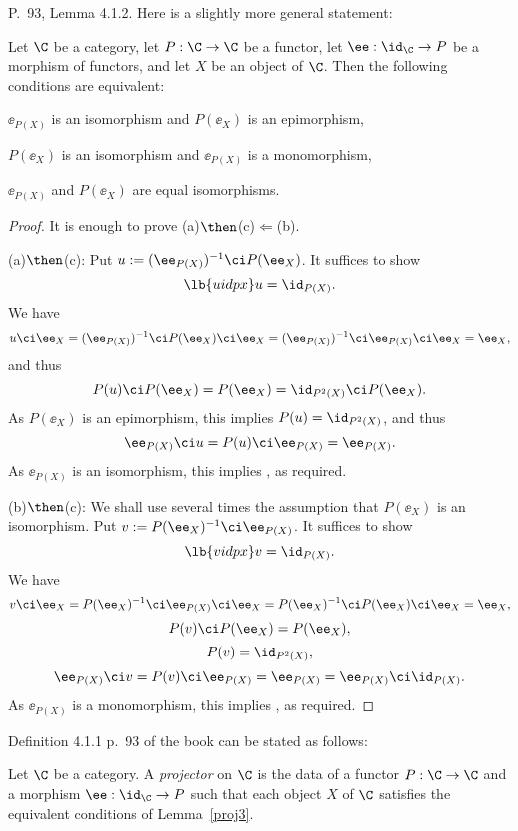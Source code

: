 \documentclass[12pt]{article}
\theoremstyle{remark}
\theoremstyle{definition}
\begin{document}
\begin{s}
P.~93, Lemma 4.1.2. Here is a slightly more general statement:

\begin{lem}
Let $\C$ be a category, let $P:\C\to\C$ be a functor, let $\ee:\id_\C\to P$ be a morphism of functors, and let $X$ be an object of $\C$. Then the following conditions are equivalent:

 $\ee_{P(X)}$ is an isomorphism and $P(\ee_X)$ is an epimorphism,

 $P(\ee_X)$ is an isomorphism and $\ee_{P(X)}$ is a monomorphism,

 $\ee_{P(X)}$ and $P(\ee_X)$ are equal isomorphisms.
\end{lem}

\begin{proof} It is enough to prove (a)$\then$(c)$\Leftarrow$(b). 

\nn(a)$\then$(c): Put $u:=(\ee_{P(X)})^{-1}\ci P(\ee_X)$. It suffices to show 
%
\begin{equation}\lb{uidpx}
u=\id_{P(X)}.
\end{equation}
%
We have 
$$
u\ci\ee_X=(\ee_{P(X)})^{-1}\ci P(\ee_X)\ci\ee_X=(\ee_{P(X)})^{-1}\ci\ee_{P(X)}\ci\ee_X=\ee_X,
$$ 
and thus 
$$
P(u)\ci P(\ee_X)=P(\ee_X)=\id_{P^2(X)}\ci P(\ee_X).
$$
As $P(\ee_X)$ is an epimorphism, this implies $P(u)=\id_{P^2(X)}$, and thus 
$$
\ee_{P(X)}\ci u=P(u)\ci\ee_{P(X)}=\ee_{P(X)}.
$$ 
As $\ee_{P(X)}$ is an isomorphism, this implies , as required.

\nn(b)$\then$(c): We shall use several times the assumption that $P(\ee_X)$ is an isomorphism. Put $v:=P(\ee_X)^{-1}\ci\ee_{P(X)}$. It suffices to show 
%
\begin{equation}\lb{vidpx}
v=\id_{P(X)}.
\end{equation}
%
We have 
$$
v\ci\ee_X=P(\ee_X)^{-1}\ci\ee_{P(X)}\ci\ee_X=P(\ee_X)^{-1}\ci P(\ee_X)\ci\ee_X=\ee_X,
$$ 
$$
P(v)\ci P(\ee_X)=P(\ee_X),
$$
$$
P(v)=\id_{P^2(X)},
$$
$$
\ee_{P(X)}\ci v=P(v)\ci\ee_{P(X)}=\ee_{P(X)}=\ee_{P(X)}\ci\id_{P(X)}.
$$ 
As $\ee_{P(X)}$ is a monomorphism, this implies , as required. 
\end{proof}

Definition 4.1.1 p.~93 of the book can be stated as follows:

\begin{df} 
Let $\C$ be a category. A {\em projector} on $\C$ is the data of a functor $P:\C\to\C$ and a morphism $\ee:\id_\C\to P$ such that each object $X$ of $\C$ satisfies the equivalent conditions of Lemma~\ref{proj3}. 
\end{df}
\end{s}
\end{document}
